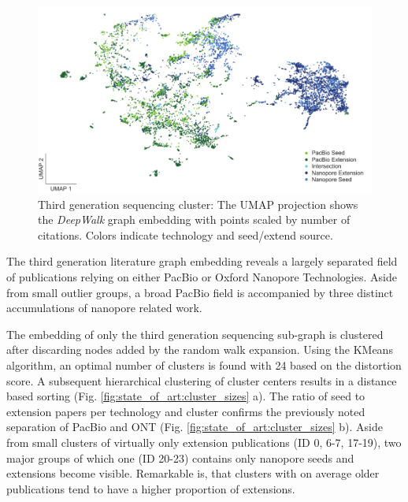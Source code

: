 \begin{figure}[h]
	\centering
	\includegraphics[width=1.0\textwidth]{figures/state_of_art/umap_lr.pdf}
	\captionsetup{format=plain}
	\caption[Third generation sequencing cluster]{Third generation sequencing cluster: The UMAP projection shows the \textit{DeepWalk} graph embedding with points scaled by number of citations. Colors indicate technology and seed/extend source.}
	\label{fig:state_of_art:umap_lr}
\end{figure}

The third generation literature graph embedding reveals a largely separated field of publications relying on either PacBio or Oxford Nanopore Technologies.
Aside from small outlier groups, a broad PacBio field is accompanied by three distinct accumulations of nanopore related work.

The embedding of only the third generation sequencing sub-graph is clustered after discarding nodes added by the random walk expansion.
Using the KMeans algorithm, an optimal number of clusters is found with 24 based on the distortion score.
A subsequent hierarchical clustering of cluster centers results in a distance based sorting (Fig. \ref{fig:state_of_art:cluster_sizes} a).
The ratio of seed to extension papers per technology and cluster confirms the previously noted separation of PacBio and ONT (Fig. \ref{fig:state_of_art:cluster_sizes} b).
Aside from small clusters of virtually only extension publications (ID 0, 6-7, 17-19), two major groups of which one (ID 20-23) contains only nanopore seeds and extensions become visible.
Remarkable is, that clusters with on average older publications tend to have a higher proportion of extensions.


